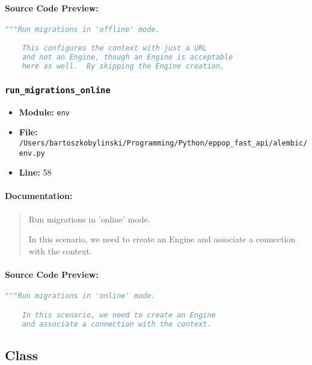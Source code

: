 \documentclass[11pt,a4paper]{article}
\begin{document}
\paragraph{Source Code Preview:}
\begin{lstlisting}[language=Python]
    """Run migrations in 'offline' mode.

    This configures the context with just a URL
    and not an Engine, though an Engine is acceptable
    here as well.  By skipping the Engine creation,
\end{lstlisting}

\vspace{1em}
\subsubsection{\texttt{run\_migrations\_online}}

\begin{itemize}
    \item \textbf{Module:} \texttt{env}
    \item \textbf{File:} \texttt{/Users/bartoszkobylinski/Programming/Python/eppop\_fast\_api/alembic/env.py}
    \item \textbf{Line:} 58
\end{itemize}

\paragraph{Documentation:}
\begin{quote}
Run migrations in 'online' mode.

In this scenario, we need to create an Engine
and associate a connection with the context.
\end{quote}

\paragraph{Source Code Preview:}
\begin{lstlisting}[language=Python]
    """Run migrations in 'online' mode.

    In this scenario, we need to create an Engine
    and associate a connection with the context.

\end{lstlisting}

\vspace{1em}
\subsection{Class}
\end{document}
